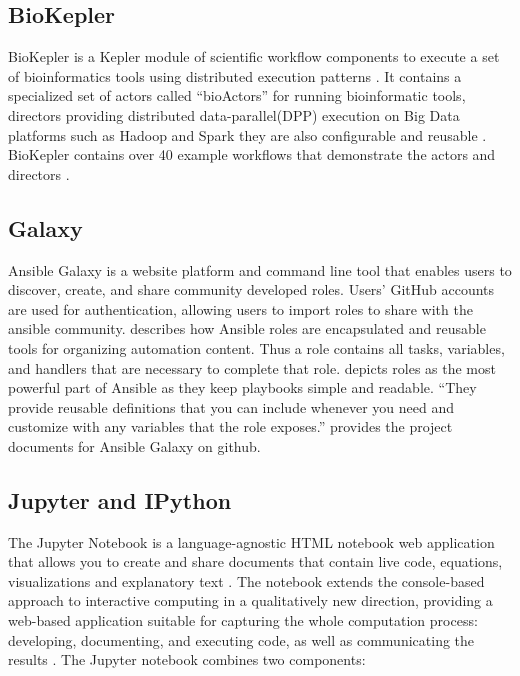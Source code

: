 \subsection{BioKepler}
    
    BioKepler is a Kepler module of scientific workflow components to
    execute a set of bioinformatics tools using distributed execution
    patterns \cite{www-biokepler}. It contains a specialized set of
    actors called ``bioActors'' for running bioinformatic tools,
    directors providing distributed data-parallel(DPP) execution on
    Big Data platforms such as Hadoop and Spark they are also
    configurable and reusable \cite{www-biokepler-demos}. BioKepler
    contains over 40 example workflows that demonstrate the actors and
    directors \cite{bioActors}.
    
\subsection{Galaxy}

    Ansible Galaxy is a website platform and command line tool that
    enables users to discover, create, and share community developed
    roles. Users' GitHub accounts are used for authentication,
    allowing users to import roles to share with the ansible
    community. \cite{www-galaxy-ansible} describes how Ansible roles
    are encapsulated and reusable tools for organizing automation
    content. Thus a role contains all tasks, variables, and handlers
    that are necessary to complete that
    role. \cite{Ansible-book-2016} depicts roles as the most powerful
    part of Ansible as they keep playbooks simple and readable. ``They
    provide reusable definitions that you can include whenever you
    need and customize with any variables that the role exposes.''
    \cite{www-github-galaxy} provides the project documents for
    Ansible Galaxy on github.
    
\subsection{Jupyter and IPython}

    The Jupyter Notebook is a language-agnostic HTML notebook web
    application that allows you to create and share documents that
    contain live code, equations, visualizations and explanatory
    text \cite{www-jupyter-1}. The notebook extends the console-based
    approach to interactive computing in a qualitatively new
    direction, providing a web-based application suitable for
    capturing the whole computation process: developing, documenting,
    and executing code, as well as communicating the
    results \cite{www-jupyter-2}. The Jupyter notebook combines two
    components:
    
